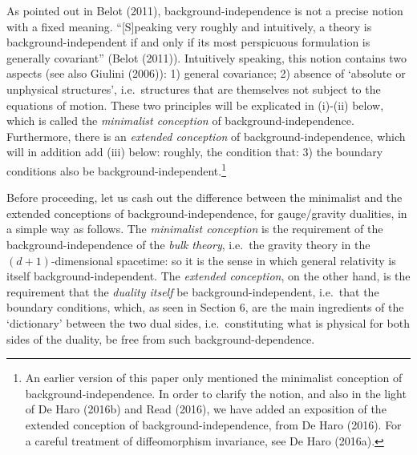 \documentclass[12pt]{article}
\renewcommand{\^}[1]{\hat{#1}}
\begin{document}
As pointed out in Belot (2011), background-independence is not a precise notion with a fixed meaning. ``[S]peaking very roughly and intuitively, a theory is background-independent if and only if its most perspicuous formulation is generally covariant'' (Belot (2011)). Intuitively speaking, this notion contains two aspects (see also Giulini (2006)): 1) general covariance; 2) absence of `absolute or unphysical structures', i.e.~structures that are themselves not subject to the equations of motion. These two principles will be explicated in (i)-(ii) below, which is called the {\it minimalist conception} of background-independence. Furthermore, there is an {\it extended conception} of background-independence, which will in addition add (iii) below: roughly, the condition that: 3) the boundary conditions also be background-independent.\footnote{An earlier version of this paper only mentioned the minimalist conception of background-independence. In order to clarify the notion, and also in the light of De Haro (2016b) and Read (2016), we have added an exposition of the extended conception of background-independence, from De Haro (2016). For a careful treatment of diffeomorphism invariance, see De Haro (2016a).}

Before proceeding, let us cash out the difference between the minimalist and the extended conceptions of background-independence, for gauge/gravity dualities, in a simple way as follows. The {\it minimalist conception} is the requirement of the background-independence of the {\it bulk theory}, i.e.~the gravity theory in the $(d+1)$-dimensional spacetime: so it is the sense in which general relativity is itself background-independent. The {\it extended conception}, on the other hand, is the requirement that the {\it duality itself} be background-independent, i.e.~that the boundary conditions, which, as seen in Section 6, are the main ingredients of the `dictionary' between the two dual sides, i.e.~constituting what is physical for both sides of the duality, be free from such background-dependence.
\end{document}
